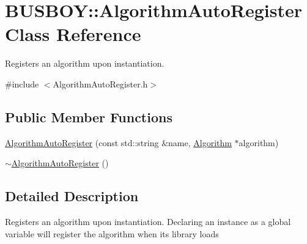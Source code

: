 \hypertarget{classBUSBOY_1_1AlgorithmAutoRegister}{
\section{BUSBOY::AlgorithmAutoRegister Class Reference}
\label{classBUSBOY_1_1AlgorithmAutoRegister}
}


Registers an algorithm upon instantiation.  


{\ttfamily \#include $<$AlgorithmAutoRegister.h$>$}\subsection*{Public Member Functions}
\begin{DoxyCompactItemize}
\item 
\hyperlink{classBUSBOY_1_1AlgorithmAutoRegister_a3274914a1f3d25cb96f48d8b790f684e}{AlgorithmAutoRegister} (const std::string \&name, \hyperlink{classBUSBOY_1_1Algorithm}{Algorithm} $\ast$algorithm)
\item 
\hyperlink{classBUSBOY_1_1AlgorithmAutoRegister_a5af456a18f948b22c72112b908831537}{$\sim$AlgorithmAutoRegister} ()
\end{DoxyCompactItemize}


\subsection{Detailed Description}
Registers an algorithm upon instantiation. Declaring an instance as a global variable will register the algorithm when its library loads 

